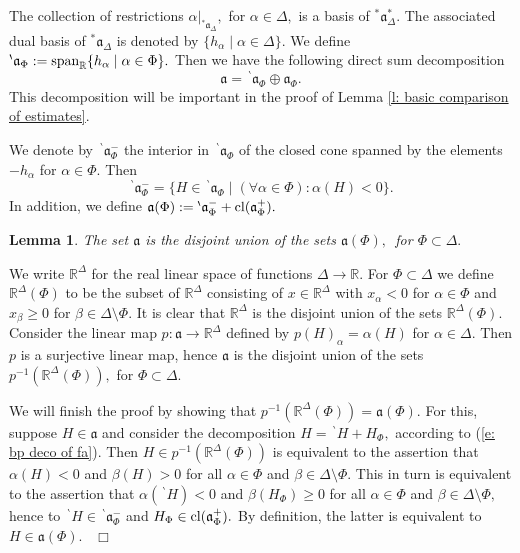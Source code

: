 \documentclass[12pt,a4paper]{article}
\newtheorem{Lemma}[Thm]{Lemma}
\newenvironment{lemma}[0]{\begin{Lemma}\noindent}%
{\end{Lemma}}
\def\proof{\par\noindent{\it Proof.}{\ }{\ }}
\def\qed{~\hfill\hbox{$\Box$}\medbreak}
\def\msy#1{{\mathbb #1}}
\def\R{{\msy R}}
\def\ga{\alpha}
\def\gb{\beta}
\def\gD{\Delta}
\def\got#1{\mathfrak #1}
\def\fa{{\got a}}
\def\to{\rightarrow}
\numberwithin{Thm}{section}
\numberwithin{equation}{section}
\numberwithin{equation}{section}
\def\cl{{\rm cl}}
\def\bp{\!{\,}^\backprime}
\begin{document}
The collection of restrictions $\ga|_{{}^*\fa_\gD},$ 
for $\ga \in \gD,$ is a basis of ${}^*\fa_\gD^*.$ The associated dual basis 
of ${}^*\fa_\gD$ is denoted by $\{h_\ga\mid \ga \in \gD\}.$ We define
$
\bp \fa_\Phi : ={\rm span}_\R\{h_\ga \mid \ga \in \Phi\}.
$
Then we have the following direct sum decomposition
\begin{equation}
\label{e: bp deco of fa}
\fa = \bp\fa_\Phi \oplus \fa_\Phi.
\end{equation} 
This decomposition will be important in the proof of Lemma 
\ref{l: basic comparison of estimates}.

We denote by $\bp \fa_\Phi^-$ the interior in $\bp\fa_\Phi$ of the closed
cone spanned by the elements $- h_\ga$ for $\ga \in \Phi.$ Then 
$$ 
\bp\fa_\Phi^- =  \{ H \in \bp\fa_\Phi \mid (\forall \ga\in \Phi): \ga(H) < 0\}.
$$%
In addition, we define $\fa(\Phi):= \bp \fa_\Phi^- + \cl(\fa_\Phi^+).$
\begin{lemma}
The set $\fa$ is the disjoint union of the sets $\fa(\Phi),\,$ for $\Phi \subset \gD.$ 
\end{lemma}
\proof
We write $\R^\gD$ for the real linear space of functions $\gD \to \R.$ 
For $\Phi\subset \gD$ we define  $\R^\gD(\Phi)$ to be the subset of 
$\R^\gD$ consisting of $x \in \R^\gD$ with $x_\ga<0$ for $\ga\in \Phi$ 
and $x_\gb \geq 0$ for $\gb\in \gD\setminus \Phi.$ It is clear that
$\R^\gD$ is the disjoint union of the sets $\R^\gD(\Phi).$ 
Consider the linear map $p: \fa \to \R^\gD$ defined by $p(H)_\ga = \ga(H)$ 
for $\ga \in \gD.$ Then $p$ is a surjective linear map, hence
$\fa$ is the disjoint union of the sets $p^{-1}(\R^\gD(\Phi)),$ for $\Phi \subset \gD.$ 

We  will finish the proof by showing that $p^{-1}(\R^\gD(\Phi)) = \fa(\Phi).$ 
For this, suppose $H \in \fa$ and consider the decomposition
$H = \bp H + H_\Phi,$ according to (\ref{e: bp deco of fa}). Then  
$H \in p^{-1}(\R^\gD(\Phi)) $ is equivalent to the assertion that
$\ga(H) < 0$ and $\gb(H) >0$ 
for all $\ga \in \Phi$ and $\gb \in \gD\setminus \Phi.$  
This in turn is equivalent to the assertion that $\ga(\bp H) < 0$ and $\gb(H_\Phi) \geq 0$ 
for all $\ga \in \Phi$ and $\gb \in \gD\setminus \Phi,$ hence to 
$\bp H \in \bp \fa_\Phi^-$ and $H_\Phi \in \cl(\fa_\Phi^+).$ 
By definition, the latter is equivalent to $H \in \fa(\Phi).$ 
\qed
\end{document}
